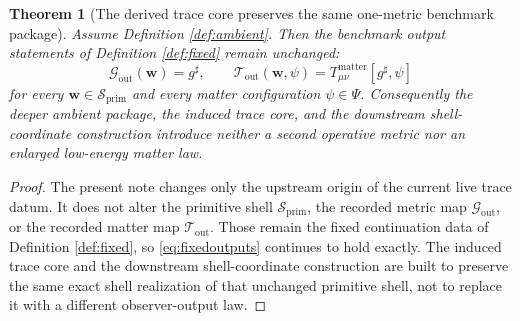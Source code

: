 \documentclass[11pt]{article}
\newcommand{\CompletedMetric}{g^{\sharp}}
\newcommand{\PrimShell}{\mathcal S_{\mathrm{prim}}}
\newcommand{\MetricOut}{\mathscr G_{\mathrm{out}}}
\newcommand{\MatterOut}{\mathscr T_{\mathrm{out}}}
\newtheorem{theorem}{Theorem}
\begin{document}
\begin{theorem}[The derived trace core preserves the same one-metric benchmark package]
\label{thm:outputs}
Assume Definition \ref{def:ambient}. Then the benchmark output statements of Definition \ref{def:fixed} remain unchanged:
\[
\MetricOut(\mathbf w)=\CompletedMetric,
\qquad
\MatterOut(\mathbf w,\psi)
=
T_{\mu\nu}^{\mathrm{matter}}[\CompletedMetric,\psi]
\]
for every \(\mathbf w\in\PrimShell\) and every matter configuration \(\psi\in\Psi\). Consequently the deeper ambient package, the induced trace core, and the downstream shell-coordinate construction introduce neither a second operative metric nor an enlarged low-energy matter law.
\end{theorem}

\begin{proof}
The present note changes only the upstream origin of the current live trace datum. It does not alter the primitive shell \(\PrimShell\), the recorded metric map \(\MetricOut\), or the recorded matter map \(\MatterOut\). Those remain the fixed continuation data of Definition \ref{def:fixed}, so \eqref{eq:fixedoutputs} continues to hold exactly. The induced trace core and the downstream shell-coordinate construction are built to preserve the same exact shell realization of that unchanged primitive shell, not to replace it with a different observer-output law.
\end{proof}
\end{document}
